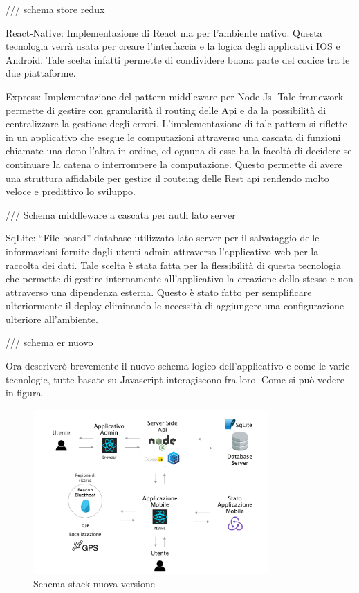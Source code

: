 	/// schema store redux\vspace{5mm}

	React-Native: Implementazione di React ma per l’ambiente nativo. Questa tecnologia verrà usata per creare l’interfaccia e la logica degli applicativi IOS e Android. Tale scelta infatti permette di condividere buona parte del codice tra le due piattaforme.\vspace{5mm}

	Express: Implementazione del pattern middleware per Node Js. Tale framework permette di gestire con granularità il routing delle Api e da la possibilità di centralizzare la gestione degli errori. L'implementazione di tale pattern si riflette in un applicativo che esegue le computazioni attraverso una cascata di funzioni chiamate una dopo l'altra in ordine, ed ognuna di esse ha la facoltà di decidere se continuare la catena o interrompere la computazione. Questo permette di avere una struttura affidabile per gestire il routeing delle Rest api rendendo molto veloce e predittivo lo sviluppo.\vspace{5mm}
	
	/// Schema middleware a cascata per auth lato server\vspace{5mm}

	SqLite: “File-based” database utilizzato lato server per il salvataggio delle informazioni fornite dagli utenti admin attraverso l’applicativo web per la raccolta dei dati. Tale scelta è stata fatta per la flessibilità di questa tecnologia che permette di gestire internamente all’applicativo la creazione dello stesso e non attraverso una dipendenza esterna. Questo è stato fatto per semplificare ulteriormente il deploy eliminando le necessità di aggiungere una configurazione ulteriore all’ambiente.\vspace{5mm}
	
	/// schema er nuovo
	
	\vspace{5mm}Ora descriverò brevemente il nuovo schema logico dell'applicativo e come le varie tecnologie, tutte basate su Javascript interagiscono fra loro.\vspace{5mm}
	Come si può vedere in figura

\begin{figure}[h]
\centering
\includegraphics[width=0.8\textwidth]{images/stackAlakai.png}
\caption{Schema stack nuova versione}
\end{figure}

